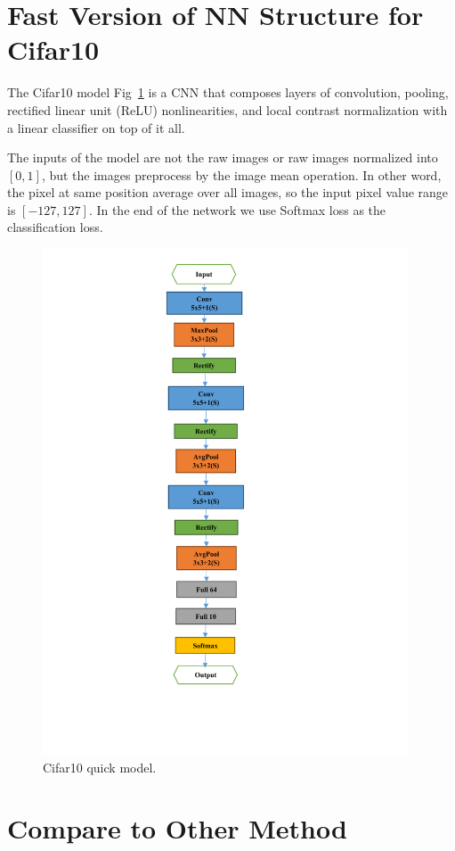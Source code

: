 \documentclass[12pt]{article}
\begin{document}
\section{Fast Version of NN Structure for Cifar10}
The Cifar10 model Fig~\ref{fig:quick_model} is a CNN that composes layers of convolution, pooling, rectified linear unit (ReLU) nonlinearities, and local contrast normalization with a linear classifier on top of it all.

The inputs of the model are not the raw images or raw images normalized into $[0,1]$, but the images preprocess by the image mean operation. In other word, the pixel at same position average over all images, so the input pixel value range is $[-127,127]$. In the end of the network we use Softmax loss as the classification loss.

\begin{figure}[!ht]
    \centering
    \includegraphics[height=15cm]{3.pdf}
    \caption{\label{fig:quick_model} Cifar10 quick model. }
\end{figure}

\section{Compare to Other Method}
\end{document}
